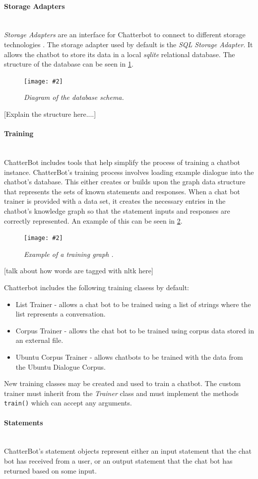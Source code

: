 \documentclass[12pt,a4paper]{article}
\newcommand{\myparagraph}[1]{\paragraph{#1}\mbox{}\\} %
\newcommand{\figuremacro}[5]{
    \begin{figure}[#1]
        \centering
        \texttt{[image: \#2]}
        \caption[#3]{\textbf{#3}#4}
        \label{fig:#2}
    \end{figure}
}
\begin{document}
\myparagraph{Storage Adapters}
\textit{Storage Adapters} are an interface for Chatterbot to connect to different storage technologies \cite{Chatterbot:online}. The storage adapter used by default is the \textit{SQL Storage Adapter}. It allows the chatbot to store its data in a local \textit{sqlite} relational database. The structure of the database can be seen in \cref{fig:db-schema}.

\figuremacro{h}{db-schema}{}{\small{\textit{Diagram of the database schema.}}}{0.9}  

[Explain the structure here....]

\myparagraph{Training}
ChatterBot includes tools that help simplify the process of training a chatbot instance. ChatterBot’s training process involves loading example dialogue into the chatbot’s database. This either creates or builds upon the graph data structure that represents the sets of known statements and responses. When a chat bot trainer is provided with a data set, it creates the necessary entries in the chatbot’s knowledge graph so that the statement inputs and responses are correctly represented. An example of this can be seen in \cref{fig:training-graph}.

\figuremacro{h}{training-graph}{}{\small{\textit{Example of a training graph \cite{Chatterbot:online}.}}}{1.0} 

[talk about how words are tagged with nltk here]

Chatterbot includes the following training clasess by default:
\begin{itemize}
    \item List Trainer - allows a chat bot to be trained using a list of strings where the list represents a conversation.
    \item Corpus Trainer - allows the chat bot to be trained using corpus data stored in an external file.
    \item Ubuntu Corpus Trainer - allows chatbots to be trained with the data from the Ubuntu Dialogue Corpus.
\end{itemize}

New training classes may be created and used to train a chatbot. The custom trainer must inherit from the \textit{Trainer} class and must implement the methods \texttt{train()} which can accept any arguments.

\myparagraph{Statements}
ChatterBot’s statement objects represent either an input statement that the chat bot has received from a user, or an output statement that the chat bot has returned based on some input.
\end{document}
